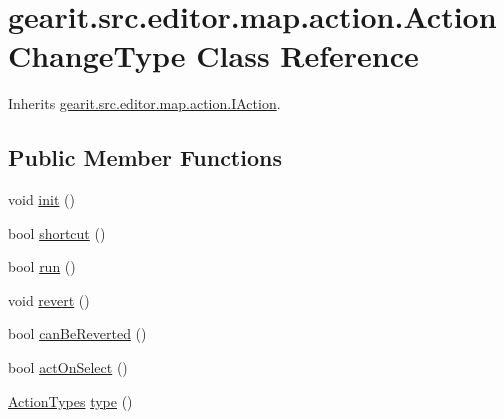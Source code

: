 \hypertarget{classgearit_1_1src_1_1editor_1_1map_1_1action_1_1_action_change_type}{\section{gearit.\+src.\+editor.\+map.\+action.\+Action\+Change\+Type Class Reference}
\label{classgearit_1_1src_1_1editor_1_1map_1_1action_1_1_action_change_type}
}


Inherits \hyperlink{interfacegearit_1_1src_1_1editor_1_1map_1_1action_1_1_i_action}{gearit.\+src.\+editor.\+map.\+action.\+I\+Action}.

\subsection*{Public Member Functions}
\begin{DoxyCompactItemize}
\item 
void \hyperlink{classgearit_1_1src_1_1editor_1_1map_1_1action_1_1_action_change_type_a018c898c95cb9f87adfd960f0904d43c}{init} ()
\item 
bool \hyperlink{classgearit_1_1src_1_1editor_1_1map_1_1action_1_1_action_change_type_a06118bc86cae3b923ca623dfdd5957c6}{shortcut} ()
\item 
bool \hyperlink{classgearit_1_1src_1_1editor_1_1map_1_1action_1_1_action_change_type_a51440cbbfd80dec84f88094094de4f85}{run} ()
\item 
void \hyperlink{classgearit_1_1src_1_1editor_1_1map_1_1action_1_1_action_change_type_aa503d3a572694a88e06d7ae18eba571d}{revert} ()
\item 
bool \hyperlink{classgearit_1_1src_1_1editor_1_1map_1_1action_1_1_action_change_type_a8488ddbf9e0c1d56a22d9804137f8e10}{can\+Be\+Reverted} ()
\item 
bool \hyperlink{classgearit_1_1src_1_1editor_1_1map_1_1action_1_1_action_change_type_a8935f96823b5aaa5c05cb6976b280091}{act\+On\+Select} ()
\item 
\hyperlink{namespacegearit_1_1src_1_1editor_1_1map_1_1action_af036712a7d960b13d1e31954e65c00e3}{Action\+Types} \hyperlink{classgearit_1_1src_1_1editor_1_1map_1_1action_1_1_action_change_type_a4b9f70570af908ebe9073adaa8c28aa9}{type} ()
\end{DoxyCompactItemize}


